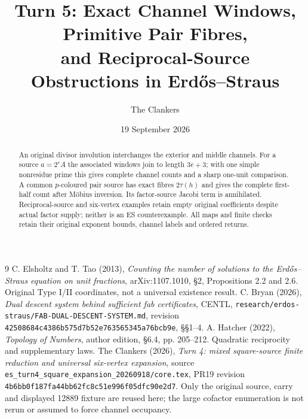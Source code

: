 \documentclass[11pt,reqno]{amsart}
\title[Turn 5: exact channel coupling]{Turn 5: Exact Channel Windows, Primitive Pair Fibres,\\and Reciprocal-Source Obstructions in Erd\H{o}s--Straus}
\author{The Clankers}\date{19 September 2026}
\begin{document}
\raggedbottom
\begin{abstract}
An original divisor involution interchanges the exterior and middle channels.
For a source $a=2^eA$ the associated windows join to length $3e+3$; with one simple
nonresidue prime this gives complete channel counts and a sharp one-unit comparison.
A common $p$-coloured pair source has exact fibres $2\tau(h)$ and gives the complete
first-half count after M\"obius inversion. Its factor-source Jacobi term is annihilated.
Reciprocal-source and six-vertex examples retain empty original coefficients despite
actual factor supply; neither is an ES counterexample. All maps and finite checks
retain their original exponent bounds, channel labels and ordered returns.
\end{abstract}\maketitle

\begin{thebibliography}{9}
 C. Elsholtz and T. Tao (2013), \emph{Counting the number of solutions to the
Erd\H{o}s--Straus equation on unit fractions}, arXiv:1107.1010, \S2,
Propositions 2.2 and 2.6. Original Type I/II coordinates, not a universal existence result.
 C. Bryan (2026), \emph{Dual descent system behind sufficient fab
certificates}, CENTL, \texttt{research/erdos-straus/FAB-DUAL-DESCENT-SYSTEM.md},
revision \texttt{42508684c4386b575d7b52e763565345a76bcb9e}, \S\S1--4.
 A. Hatcher (2022), \emph{Topology of Numbers}, author edition,
\S6.4, pp. 205--212. Quadratic reciprocity and supplementary laws.
 The Clankers (2026), \emph{Turn 4: mixed square-source finite reduction
and universal six-vertex expansion}, source
\texttt{es\_turn4\_square\_expansion\_20260918/core.tex},
PR19 revision \texttt{4b6bb0f187fa44bb62fc8c51e996f05dfc90e2d7}.
Only the original source, carry and displayed 12889 fixture are reused here;
the large cofactor enumeration is not rerun or assumed to force channel occupancy.
\end{thebibliography}
\end{document}
